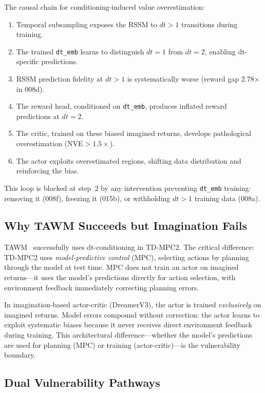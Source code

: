 \documentclass[letterpaper]{article}
\begin{document}
The causal chain for conditioning-induced value overestimation:
\begin{enumerate}[nosep]
    \item Temporal subsampling exposes the RSSM to $dt>1$ transitions during training.
    \item The trained \texttt{dt\_emb} learns to distinguish $dt{=}1$ from $dt{=}2$, enabling dt-specific predictions.
    \item RSSM prediction fidelity at $dt>1$ is systematically worse (reward gap 2.78$\times$ in 008d).
    \item The reward head, conditioned on \texttt{dt\_emb}, produces inflated reward predictions at $dt{=}2$.
    \item The critic, trained on these biased imagined returns, develops pathological overestimation (NVE$>1.5\times$).
    \item The actor exploits overestimated regions, shifting data distribution and reinforcing the bias.
\end{enumerate}

This loop is blocked at step~2 by any intervention preventing \texttt{dt\_emb} training: removing it (008f), freezing it (015b), or withholding $dt>1$ training data (008a).

\subsection{Why TAWM Succeeds but Imagination Fails}

TAWM~\cite{nhu2025tawm} successfully uses dt-conditioning in TD-MPC2.
The critical difference: TD-MPC2 uses \emph{model-predictive control} (MPC), selecting actions by planning through the model at test time.
MPC does not train an actor on imagined returns---it uses the model's predictions directly for action selection, with environment feedback immediately correcting planning errors.

In imagination-based actor-critic (DreamerV3), the actor is trained \emph{exclusively} on imagined returns.
Model errors compound without correction: the actor learns to exploit systematic biases because it never receives direct environment feedback during training.
This architectural difference---whether the model's predictions are used for planning (MPC) or training (actor-critic)---is the vulnerability boundary.

\subsection{Dual Vulnerability Pathways}
\end{document}
